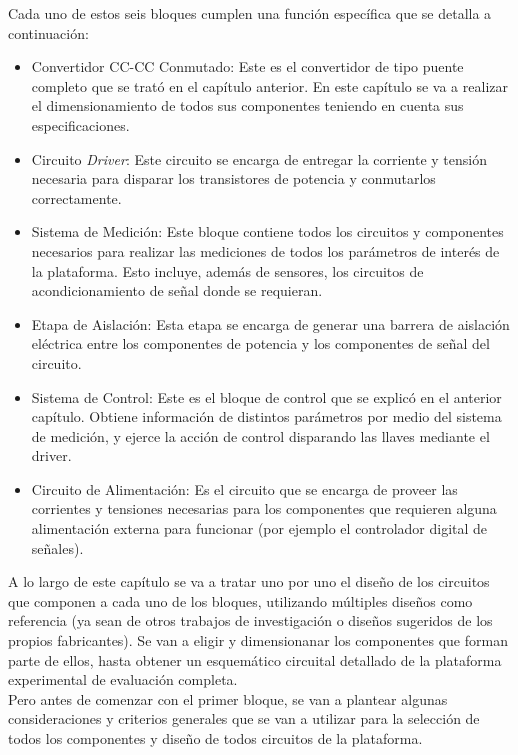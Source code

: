 Cada uno de estos seis bloques cumplen una función específica que se detalla a continuación:\\

\begin{itemize}
    \item {\SemiBold Convertidor CC-CC Conmutado:} Este es el convertidor de tipo puente completo que se trató en el capítulo anterior. En este capítulo se va a realizar el dimensionamiento de todos sus componentes teniendo en cuenta sus especificaciones. 
    \item {\SemiBold Circuito \textit{Driver}:} Este circuito se encarga de entregar la corriente y tensión necesaria para disparar los transistores de potencia y conmutarlos correctamente.
    \item {\SemiBold Sistema de Medición:} Este bloque contiene todos los circuitos y componentes necesarios para realizar las mediciones de todos los parámetros de interés de la plataforma. Esto incluye, además de sensores, los circuitos de acondicionamiento de señal donde se requieran.
    \item {\SemiBold Etapa de Aislación:} Esta etapa se encarga de generar una barrera de aislación eléctrica entre los componentes de potencia y los componentes de señal del circuito.
    \item {\SemiBold Sistema de Control:} Este es el bloque de control que se explicó en el anterior capítulo. Obtiene información de distintos parámetros por medio del sistema de medición, y ejerce la acción de control disparando las llaves mediante el driver.
    \item {\SemiBold Circuito de Alimentación:} Es el circuito que se encarga de proveer las corrientes y tensiones necesarias para los componentes que requieren alguna alimentación externa para funcionar (por ejemplo el controlador digital de señales).\\
\end{itemize}

A lo largo de este capítulo se va a tratar uno por uno el diseño de los circuitos que componen a cada uno de los bloques, utilizando múltiples diseños como referencia (ya sean de otros trabajos de investigación o diseños sugeridos de los propios fabricantes). Se van a eligir y dimensionanar los componentes que forman parte de ellos, hasta obtener un esquemático circuital detallado de la plataforma experimental de evaluación completa.\\

Pero antes de comenzar con el primer bloque, se van a plantear algunas consideraciones y criterios generales que se van a utilizar para la selección de todos los componentes y diseño de todos circuitos de la plataforma.\\

